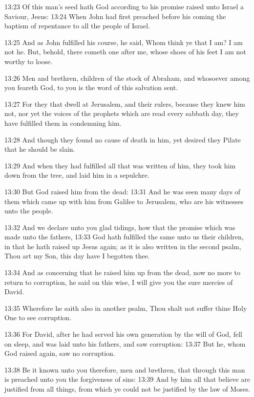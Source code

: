 13:23 Of this man's seed hath God according to his promise raised unto
Israel a Saviour, Jesus: 13:24 When John had first preached before his
coming the baptism of repentance to all the people of Israel.

13:25 And as John fulfilled his course, he said, Whom think ye that I
am?  I am not he. But, behold, there cometh one after me, whose shoes
of his feet I am not worthy to loose.

13:26 Men and brethren, children of the stock of Abraham, and
whosoever among you feareth God, to you is the word of this salvation
sent.

13:27 For they that dwell at Jerusalem, and their rulers, because they
knew him not, nor yet the voices of the prophets which are read every
sabbath day, they have fulfilled them in condemning him.

13:28 And though they found no cause of death in him, yet desired they
Pilate that he should be slain.

13:29 And when they had fulfilled all that was written of him, they
took him down from the tree, and laid him in a sepulchre.

13:30 But God raised him from the dead: 13:31 And he was seen many
days of them which came up with him from Galilee to Jerusalem, who are
his witnesses unto the people.

13:32 And we declare unto you glad tidings, how that the promise which
was made unto the fathers, 13:33 God hath fulfilled the same unto us
their children, in that he hath raised up Jesus again; as it is also
written in the second psalm, Thou art my Son, this day have I begotten
thee.

13:34 And as concerning that he raised him up from the dead, now no
more to return to corruption, he said on this wise, I will give you
the sure mercies of David.

13:35 Wherefore he saith also in another psalm, Thou shalt not suffer
thine Holy One to see corruption.

13:36 For David, after he had served his own generation by the will of
God, fell on sleep, and was laid unto his fathers, and saw corruption:
13:37 But he, whom God raised again, saw no corruption.

13:38 Be it known unto you therefore, men and brethren, that through
this man is preached unto you the forgiveness of sins: 13:39 And by
him all that believe are justified from all things, from which ye
could not be justified by the law of Moses.

